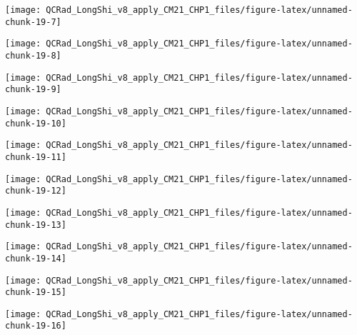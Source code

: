 \documentclass[
  10pt,
  a4paper,oneside]{article}
\begin{document}
\begin{center}\texttt{[image: QCRad\_LongShi\_v8\_apply\_CM21\_CHP1\_files/figure-latex/unnamed-chunk-19-7]} \end{center}

\begin{center}\texttt{[image: QCRad\_LongShi\_v8\_apply\_CM21\_CHP1\_files/figure-latex/unnamed-chunk-19-8]} \end{center}

\begin{center}\texttt{[image: QCRad\_LongShi\_v8\_apply\_CM21\_CHP1\_files/figure-latex/unnamed-chunk-19-9]} \end{center}

\begin{center}\texttt{[image: QCRad\_LongShi\_v8\_apply\_CM21\_CHP1\_files/figure-latex/unnamed-chunk-19-10]} \end{center}

\begin{center}\texttt{[image: QCRad\_LongShi\_v8\_apply\_CM21\_CHP1\_files/figure-latex/unnamed-chunk-19-11]} \end{center}

\begin{center}\texttt{[image: QCRad\_LongShi\_v8\_apply\_CM21\_CHP1\_files/figure-latex/unnamed-chunk-19-12]} \end{center}

\begin{center}\texttt{[image: QCRad\_LongShi\_v8\_apply\_CM21\_CHP1\_files/figure-latex/unnamed-chunk-19-13]} \end{center}

\begin{center}\texttt{[image: QCRad\_LongShi\_v8\_apply\_CM21\_CHP1\_files/figure-latex/unnamed-chunk-19-14]} \end{center}

\begin{center}\texttt{[image: QCRad\_LongShi\_v8\_apply\_CM21\_CHP1\_files/figure-latex/unnamed-chunk-19-15]} \end{center}

\begin{center}\texttt{[image: QCRad\_LongShi\_v8\_apply\_CM21\_CHP1\_files/figure-latex/unnamed-chunk-19-16]} \end{center}
\end{document}
